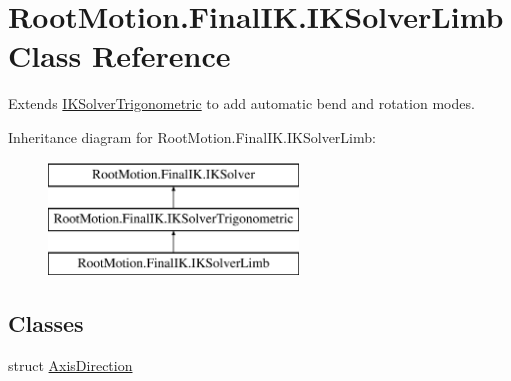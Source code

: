 \hypertarget{class_root_motion_1_1_final_i_k_1_1_i_k_solver_limb}{}\section{Root\+Motion.\+Final\+I\+K.\+I\+K\+Solver\+Limb Class Reference}
\label{class_root_motion_1_1_final_i_k_1_1_i_k_solver_limb}


Extends \mbox{\hyperlink{class_root_motion_1_1_final_i_k_1_1_i_k_solver_trigonometric}{I\+K\+Solver\+Trigonometric}} to add automatic bend and rotation modes.  


Inheritance diagram for Root\+Motion.\+Final\+I\+K.\+I\+K\+Solver\+Limb\+:\begin{figure}[H]
\begin{center}
\leavevmode
\includegraphics[height=3.000000cm]{class_root_motion_1_1_final_i_k_1_1_i_k_solver_limb}
\end{center}
\end{figure}
\subsection*{Classes}
\begin{DoxyCompactItemize}
\item 
struct \mbox{\hyperlink{struct_root_motion_1_1_final_i_k_1_1_i_k_solver_limb_1_1_axis_direction}{Axis\+Direction}}
\end{DoxyCompactItemize}
